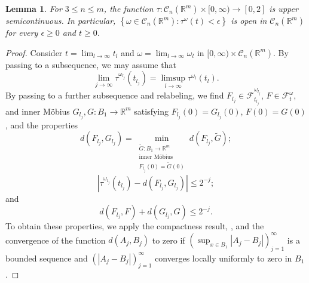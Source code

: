 \documentclass[a4paper,leqno,11pt]{amsart}
\numberwithin{equation}{section}
\newtheorem{lemma}[theorem]{Lemma}
\theoremstyle{remark}
\theoremstyle{remark}
\newcommand{\R}{\mathbb{R}}
\newcommand{\cC}{\mathcal{C}}
\begin{document}
\begin{lemma}\label{lemm:distortionfunction}
For $3\le n \le m$, the function $\tau \colon \cC_{n}( \R^m ) \times [0,\infty) \to [0,2]$ is upper semicontinuous. In particular, $\left\{ \omega \in \cC_{n}(\R^m) \colon \tau^{\omega}(t) < \epsilon \right\}$ is open in $\cC_n( \R^m )$ for every $\epsilon \geq 0$ and $t \geq 0$.
\end{lemma}
\begin{proof}
Consider $t = \lim_{ l \rightarrow \infty } t_l$ and $\omega = \lim_{ l \rightarrow \infty } \omega_l$ in $[0,\infty) \times \cC_{n}( \R^m )$. By passing to a subsequence, we may assume that
\begin{equation*}
    \lim_{ j \rightarrow \infty } \tau^{ \omega_{ l_j } }( t_{ l_j } )
    = 
    \limsup_{ l \rightarrow \infty } \tau^{ \omega_{ l } }(t_{ l }).
\end{equation*}
By passing to a further subsequence and relabeling, we find $F_{l_j} \in \mathcal{F}^{ \omega_{l_j} }_{ t_{l_j} }$, $F \in \mathcal{F}^{ \omega }_{ t }$, and inner Möbius $G_{l_j}, G \colon B_1 \to \R^m$ satisfying $F_{l_j}(0) = G_{l_j}(0)$, $F( 0 ) = G(0)$, and the properties
\[
d( F_{ l_j }, G_{ l_j } )
    =
    \min_{ \substack{ \widetilde{G} \colon B_1 \to \R^m \\ \text{inner Möbius} \\ F_{ l_j }(0) = \widetilde{G}(0) } } d( F_{ l_j }, \widetilde{G} );
\]
\[
| \tau^{ \omega_{ l_j } }(t_{l_j}) - d( F_{ l_j }, G_{ l_j } ) | \leq 2^{-j};
\]
and
\[
    d( F_{ l_j }, F ) + d( G_{ l_j }, G ) \leq 2^{-j}.
\]
To obtain these properties, we apply the compactness result, , and the convergence of the function $d( A_j, B_j )$ to zero if $( \sup_{ x \in B_1 }|A_j - B_j| )_{ j = 1 }^{ \infty }$ is a bounded sequence and $( | A_j - B_j | )_{ j = 1 }^{ \infty }$ converges locally uniformly to zero in $B_1$.


\end{proof}
\end{document}

